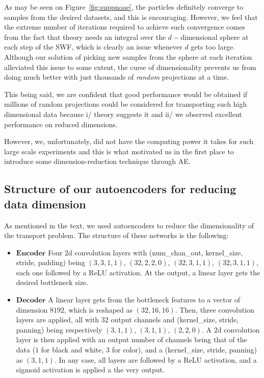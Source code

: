 As may be seen on Figure~\ref{fig:suppnoae}, the particles definitely converge to samples from the desired datasets, and this is encouraging. However, we feel that the extreme number of iterations required to achieve such convergence comes from the fact that theory needs an integral over the $d-$dimensional sphere at each step of the SWF, which is clearly an issue whenever $d$ gets too large.
Although our solution of picking new samples from the sphere at each iteration alleviated this issue to some extent, the curse of dimensionality prevents us from doing much better with just thousands of \emph{random} projections at a time.

This being said, we are confident that good performance would be obtained if millions of random projections could be considered for transporting such high dimensional data because i/ theory suggests it and ii/ we observed excellent performance on reduced dimensions.

However, we, unfortunately, did not have the computing power it takes for such large scale experiments and this is what motivated us in the first place to introduce some dimension-reduction technique through AE.

\subsection{Structure of our autoencoders for reducing data dimension}

As mentioned in the text, we used autoencoders to reduce the dimensionality of the transport problem. The structure of these networks is the following:

\begin{itemize}
  \item $\textbf{Encoder}$ Four 2d convolution layers with (num\_chan\_out, kernel\_size, stride, padding) being $(3,3,1,1)$, $(32,2,2,0)$, $(32,3,1,1)$, $(32, 3,1,1)$, each one followed by a ReLU activation. At the output, a linear layer gets the desired bottleneck size.

  \item $\textbf{Decoder}$ A linear layer gets from the bottleneck features to a vector of dimension $8192$, which is reshaped as $(32, 16,16)$. Then, three convolution layers are applied, all with $32$ output channels and (kernel\_size, stride, panning) being respectively $(3,1,1)$, $(3,1,1)$, $(2,2,0)$. A 2d convolution layer is then applied with an output number of channels being that of the data ($1$ for black and white, $3$ for color), and a (kernel\_size, stride, panning) as $(3,1,1)$. In any case, all layers are followed by a ReLU activation, and a sigmoid activation is applied a the very output.
\end{itemize}

